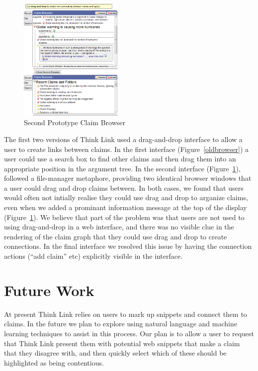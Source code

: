\documentclass{chi2009}
\begin{document}
\begin{figure}[tb]
\begin{center}
	\includegraphics[width=5cm]{../screenshots/claimbrowse.png}
	\caption{Second Prototype Claim Browser}
	\label{secondbrowser}
\end{center}
\end{figure}

The first two versions of Think Link used a drag-and-drop interface to allow a user to create links between claims. In the first interface (Figure~\ref{oldbrowser}) a user could use a search box to find other claims and then drag them into an appropriate position in the argument tree. In the second interface (Figure~\ref{secondbrowser}), followed a file-manager metaphore, providing two identical browser windows that a user could drag and drop claims between. In both cases, we found that users would often not intially realise they could use drag and drop to arganize claims, even when we added a prominant information message at the top of the display (Figure~\ref{secondbrowser}). We believe that part of the problem was that users are not used to using drag-and-drop in a web interface, and there was no visible clue in the rendering of the claim graph that they could use drag and drop to create connections. In the final interface we resolved this issue by having the connection actions (``add claim'' etc) explicitly visible in the interface.

\section{Future Work}

At present Think Link relies on users to mark up snippets and connect them to claims. In the future we plan to explore using natural language and machine learning techniques to assist in this process. Our plan is to allow a user to request that Think Link present them with potential web snippets that make a claim that they disagree with, and then quickly select which of these should be highlighted as being contentious.
\end{document}
